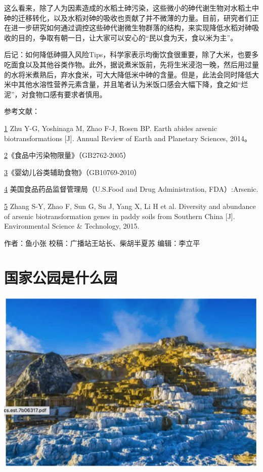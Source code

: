 \documentclass[]{book}
\begin{document}
这么看来，除了人为因素造成的水稻土砷污染，这些微小的砷代谢生物对水稻土中砷的迁移转化，以及水稻对砷的吸收也贡献了并不微薄的力量。目前，研究者们正在进一步研究如何通过调控这些砷代谢微生物群落的结构，来实现降低水稻对砷吸收的目的，争取有朝一日，让大家可以安心的``民以食为天，食以米为主''。

后记：如何降低砷摄入风险Tips，科学家表示均衡饮食很重要，除了大米，也要多吃面食以及其他谷类作物。此外，据说煮米饭前，先将生米浸泡一晚，然后用过量的水将米煮熟后，弃水食米，可大大降低米中砷的含量。但是，此法会同时降低大米中其他水溶性营养元素含量，并且笔者认为米饭口感会大幅下降，食之如``烂泥''，对食物口感有要求者慎用。

参考文献：

\href{陈心想，耿增超。西北农林科技大学学报（自然科学版），2013，41:\%20167-174．}{1}
Zhu Y-G, Yoshinaga M, Zhao F-J, Rosen BP. Earth abides arsenic
biotransformations {[}J{]}. Annual Review of Earth and Planetary
Sciences, 2014。

\href{Kezhen\%20Qian,\%20Ajay\%20Kumar,\%20et.al.\%20Renew.\%20and\%20Sustain.\%20Energy\%20Reviews,\%202015,\%2042:\%201055-1064.}{2}《食品中污染物限量》（GB2762-2005）

\href{Puga\%20A\%20P,\%20Abreu\%20C\%20A,\%20et\%20al.\%20J.\%20of\%20Environ.\%20Manage.,\%202015,\%20159:\%2086–93.}{3}《婴幼儿谷类辅助食物》（GB10769-2010）

\href{Khan\%20S,\%20Cai\%20Chao,\%20et\%20al．\%20Environ.\%20Sci.\%20\&\%20Technol.,\%202013,\%2047\%20:\%208624-8632．}{4}
美国食品药品监督管理局（U.S.Food and Drug Administration, FDA）:Arsenic.

\href{Bi\%20H,\%20Huang\%20X,\%20et\%20al.\%20Small\%202014,\%2010,\%203544.}{5}
Zhang S-Y, Zhao F, Sun G, Su J, Yang X, Li H et al. Diversity and
abundance of arsenic biotransformation genes in paddy soils from
Southern China {[}J{]}. Environmental Science \& Technology, 2015.

作者：鱼小张 校稿：广播站王站长、柴胡半夏苏 编辑：李立平

\section{国家公园是什么园}

\includegraphics[width=8.33in]{images/park1}
\end{document}
